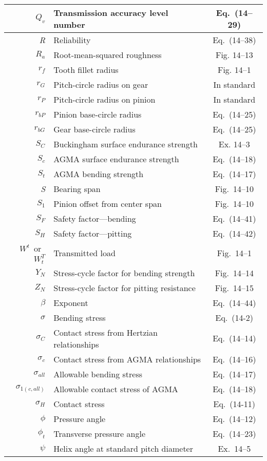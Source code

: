 \documentclass{article}
\begin{document}
\begin{center}
\begin{longtable}{| r | l | c |}
\hline
\textit{$Q_v$} & Transmission accuracy level number & Eq.~(14–29) \\
\hline
\textit{R} & Reliability & Eq.~(14–38) \\
\hline
\textit{$R_a$} & Root-mean-squared roughness & Fig. 14–13 \\
\hline
\textit{$r_f$} & Tooth fillet radius & Fig. 14–1 \\
\hline
\textit{$r_G$} & Pitch-circle radius on gear & In standard \\
\hline
\textit{$r_P$} & Pitch-circle radius on pinion & In standard \\
\hline
\textit{$r_{bP}$} & Pinion base-circle radius & Eq.~(14–25) \\
\hline
\textit{$r_{bG}$} & Gear base-circle radius & Eq.~(14–25) \\
\hline
\textit{$S_C$} & Buckingham surface endurance strength & Ex. 14–3 \\
\hline
\textit{$S_c$} & AGMA surface endurance strength & Eq.~(14–18) \\
\hline
\textit{$S_t$} & AGMA bending strength & Eq.~(14–17) \\
\hline
\textit{S} & Bearing span & Fig.~14–10 \\
\hline
\textit{$S_1$} & Pinion offset from center span & Fig.~14–10 \\
\hline
\textit{$S_F$} & Safety factor—bending & Eq.~(14–41) \\
\hline
\textit{$S_H$} & Safety factor—pitting & Eq.~(14–42) \\
\hline
$W^t$~or~\textit{$W_t^{T}$} & Transmitted load & Fig.~14–1 \\
\hline
\textit{$Y_N$} & Stress-cycle factor for bending strength & Fig.~14–14 \\
\hline
\textit{$Z_N$} & Stress-cycle factor for pitting resistance & Fig.~14–15 \\
\hline
\textit{$\beta$} & Exponent & Eq.~(14–44) \\
\hline
\textit{$\sigma$} & Bending stress & Eq.~(14-2) \\
\hline
\textit{$\sigma_C$} & Contact stress from Hertzian relationships & Eq.~(14–14) \\
\hline
\textit{$\sigma_c$} & Contact stress from AGMA relationships & Eq.~(14–16) \\
\hline
\textit{$\sigma_{all}$} & Allowable bending stress & Eq.~(14–17) \\
\hline
\textit{$\sigma_{1(c, all)}$} & Allowable contact stress of AGMA & Eq.~(14–18) \\
\hline
\textit{$\sigma_H$} & Contact stress & Eq.~(14-11) \\
\hline
\textit{$\phi$} & Pressure angle & Eq.~(14–12) \\
\hline
\textit{$\phi_t$} & Transverse pressure angle & Eq.~(14–23) \\
\hline
\textit{$\psi$} & Helix angle at standard pitch diameter & Ex.~14–5 \\
\hline
\end{longtable}
\end{center}
\end{document}
